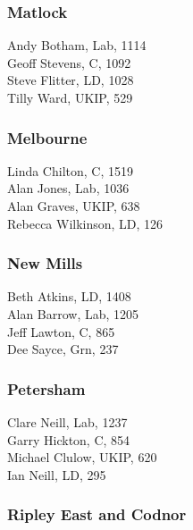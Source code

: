 \documentclass[a4paper,openany,10pt]{book}
\begin{document}
\subsubsection*{Matlock}



Andy Botham, Lab, 1114\\
Geoff Stevens, C, 1092\\
Steve Flitter, LD, 1028\\
Tilly Ward, UKIP, 529\\


\subsubsection*{Melbourne}



Linda Chilton, C, 1519\\
Alan Jones, Lab, 1036\\
Alan Graves, UKIP, 638\\
Rebecca Wilkinson, LD, 126\\


\subsubsection*{New Mills}



Beth Atkins, LD, 1408\\
Alan Barrow, Lab, 1205\\
Jeff Lawton, C, 865\\
Dee Sayce, Grn, 237\\


\subsubsection*{Petersham}



Clare Neill, Lab, 1237\\
Garry Hickton, C, 854\\
Michael Clulow, UKIP, 620\\
Ian Neill, LD, 295\\


\subsubsection*{Ripley East and Codnor}
\end{document}
